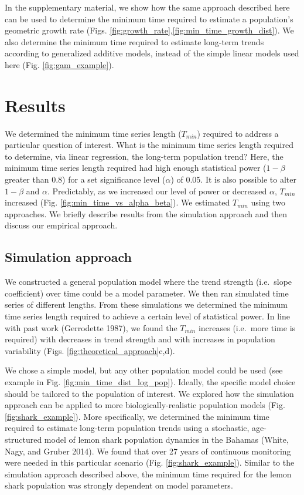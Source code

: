 \documentclass[12pt,]{article}
\begin{document}
In the supplementary material, we show how the same approach described
here can be used to determine the minimum time required to estimate a
population's geometric growth rate (Figs.
\ref{fig:growth_rate},\ref{fig:min_time_growth_dist}). We also determine
the minimum time required to estimate long-term trends according to
generalized additive models, instead of the simple linear models used
here (Fig. \ref{fig:gam_example}).

\section{Results}\label{results}

We determined the minimum time series length (\(T_{min}\)) required to
address a particular question of interest. What is the minimum time
series length required to determine, via linear regression, the
long-term population trend? Here, the minimum time series length
required had high enough statistical power (\(1-\beta\) greater than
0.8) for a set significance level (\(\alpha\)) of 0.05. It is also
possible to alter \(1-\beta\) and \(\alpha\). Predictably, as we
increased our level of power or decreased \(\alpha\), \(T_{min}\)
increased (Fig. \ref{fig:min_time_vs_alpha_beta}). We estimated
\(T_{min}\) using two approaches. We briefly describe results from the
simulation approach and then discuss our empirical approach.

\subsection{Simulation approach}\label{simulation-approach-1}

We constructed a general population model where the trend strength
(i.e.~slope coefficient) over time could be a model parameter. We then
ran simulated time series of different lengths. From these simulations
we determined the minimum time series length required to achieve a
certain level of statistical power. In line with past work (Gerrodette
1987), we found the \(T_{min}\) increases (i.e.~more time is required)
with decreases in trend strength and with increases in population
variability (Figs. \ref{fig:theoretical_approach}c,d).

We chose a simple model, but any other population model could be used
(see example in Fig. \ref{fig:min_time_dist_log_pop}). Ideally, the
specific model choice should be tailored to the population of interest.
We explored how the simulation approach can be applied to more
biologically-realistic population models (Fig. \ref{fig:shark_example}).
More specifically, we determined the minimum time required to estimate
long-term population trends using a stochastic, age-structured model of
lemon shark population dynamics in the Bahamas (White, Nagy, and Gruber
2014). We found that over 27 years of continuous monitoring were needed
in this particular scenario (Fig. \ref{fig:shark_example}). Similar to
the simulation approach described above, the minimum time required for
the lemon shark population was strongly dependent on model parameters.
\end{document}

